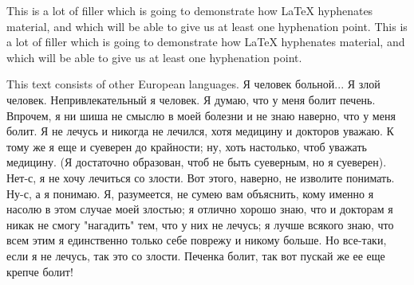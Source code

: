 \documentclass{article}
\begin{document}
This is a lot of filler which is going to demonstrate how LaTeX hyphenates
material, and which will be able to give us at least one hyphenation point.
This is a lot of filler which is going to demonstrate how LaTeX hyphenates
material, and which will be able to give us at least one hyphenation point.

This text consists of other European languages. Я человек больной... Я злой человек. Непривлекательный я человек. Я думаю, что у меня болит печень. Впрочем, я ни шиша не смыслю в моей болезни и не знаю наверно, что у меня болит. Я не лечусь и никогда не лечился, хотя медицину и докторов уважаю. К тому же я еще и суеверен до крайности; ну, хоть настолько, чтоб уважать медицину. (Я достаточно образован, чтоб не быть суеверным, но я суеверен). Нет-с, я не хочу лечиться со злости. Вот этого, наверно, не изволите понимать. Ну-с, а я понимаю. Я, разумеется, не сумею вам объяснить, кому именно я насолю в этом случае моей злостью; я отлично хорошо знаю, что и докторам я никак не смогу "нагадить" тем, что у них не лечусь; я лучше всякого знаю, что всем этим я единственно только себе поврежу и никому больше. Но все-таки, если я не лечусь, так это со злости. Печенка болит, так вот пускай же ее еще крепче болит!


\lipsum
\end{document}
